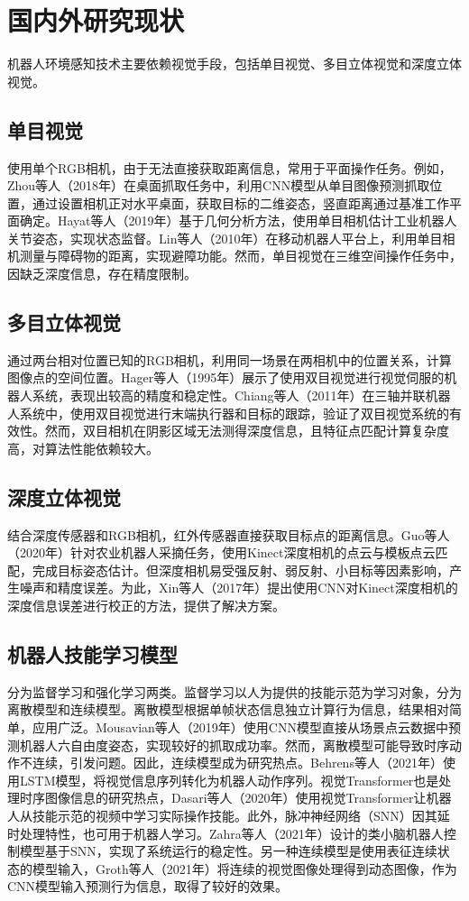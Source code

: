 \section{国内外研究现状}
机器人环境感知技术主要依赖视觉手段，包括单目视觉、多目立体视觉和深度立体视觉。

\subsection{单目视觉}
使用单个RGB相机，由于无法直接获取距离信息，常用于平面操作任务。例如，Zhou等人（2018年）在桌面抓取任务中，利用CNN模型从单目图像预测抓取位置，通过设置相机正对水平桌面，获取目标的二维姿态，竖直距离通过基准工作平面确定。Hayat等人（2019年）基于几何分析方法，使用单目相机估计工业机器人关节姿态，实现状态监督。Lin等人（2010年）在移动机器人平台上，利用单目相机测量与障碍物的距离，实现避障功能。然而，单目视觉在三维空间操作任务中，因缺乏深度信息，存在精度限制。

\subsection{多目立体视觉}
通过两台相对位置已知的RGB相机，利用同一场景在两相机中的位置关系，计算图像点的空间位置。Hager等人（1995年）展示了使用双目视觉进行视觉伺服的机器人系统，表现出较高的精度和稳定性。Chiang等人（2011年）在三轴并联机器人系统中，使用双目视觉进行末端执行器和目标的跟踪，验证了双目视觉系统的有效性。然而，双目相机在阴影区域无法测得深度信息，且特征点匹配计算复杂度高，对算法性能依赖较大。

\subsection{深度立体视觉}
结合深度传感器和RGB相机，红外传感器直接获取目标点的距离信息。Guo等人（2020年）针对农业机器人采摘任务，使用Kinect深度相机的点云与模板点云匹配，完成目标姿态估计。但深度相机易受强反射、弱反射、小目标等因素影响，产生噪声和精度误差。为此，Xin等人（2017年）提出使用CNN对Kinect深度相机的深度信息误差进行校正的方法，提供了解决方案。

\subsection{机器人技能学习模型}
分为监督学习和强化学习两类。监督学习以人为提供的技能示范为学习对象，分为离散模型和连续模型。离散模型根据单帧状态信息独立计算行为信息，结果相对简单，应用广泛。Mousavian等人（2019年）使用CNN模型直接从场景点云数据中预测机器人六自由度姿态，实现较好的抓取成功率。然而，离散模型可能导致时序动作不连续，引发问题。因此，连续模型成为研究热点。Behrens等人（2021年）使用LSTM模型，将视觉信息序列转化为机器人动作序列。视觉Transformer也是处理时序图像信息的研究热点，Dasari等人（2020年）使用视觉Transformer让机器人从技能示范的视频中学习实际操作技能。此外，脉冲神经网络（SNN）因其延时处理特性，也可用于机器人学习。Zahra等人（2021年）设计的类小脑机器人控制模型基于SNN，实现了系统运行的稳定性。另一种连续模型是使用表征连续状态的模型输入，Groth等人（2021年）将连续的视觉图像处理得到动态图像，作为CNN模型输入预测行为信息，取得了较好的效果。

